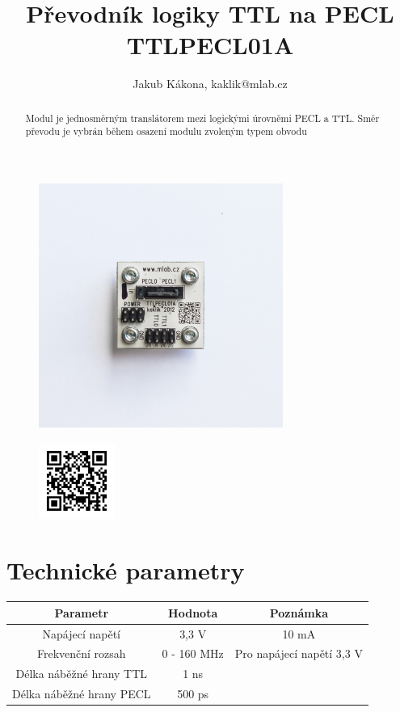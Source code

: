 \documentclass[12pt,a4paper,oneside]{article}
\begin{document}
\title{Převodník logiky TTL na PECL TTLPECL01A}
\author{Jakub Kákona, kaklik@mlab.cz}
\maketitle

\thispagestyle{empty}
\begin{abstract}
Modul je jednosměrným translátorem mezi logickými úrovněmi
PECL a TTL. Směr převodu je vybrán během osazení modulu zvoleným typem obvodu
\end{abstract}

\begin{figure} [htbp]
\begin{center}
\includegraphics [width=80mm] {../img/TTLPECL01A_top_big2.jpg} 
\end{center}
\end{figure}

\begin{figure} [b]
\includegraphics [width=25mm] {../img/TTLPECL01A_QRcode.png} 
\end{figure}

\newpage
\tableofcontents


\section{Technické parametry}
\begin{table}[htbp]
\begin{center}
\begin{tabular}{|c|c|c|}
\hline
\multicolumn{1}{|c|}{Parametr} & \multicolumn{1}{|c|}{Hodnota} & \multicolumn{1}{|c|}{Poznámka} \\ \hline
Napájecí napětí & 3,3 V &  10 mA \\ \hline
Frekvenční rozsah  & 0 - 160 MHz & Pro napájecí napětí 3,3 V \\ \hline
Délka náběžné hrany TTL  & 1 ns & \\ \hline
Délka náběžné hrany PECL  & 500 ps & \\ \hline
\end{tabular}
\end{center}
\end{table}
\end{document}
